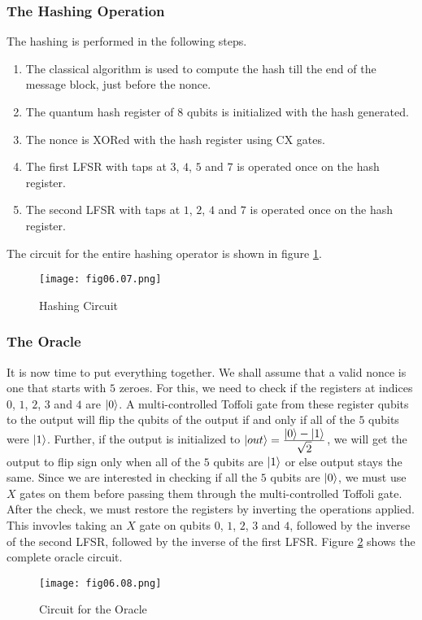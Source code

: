 \subsubsection*{The Hashing Operation}
\noindent The hashing is performed in the following steps.
\begin{enumerate}
\item The classical algorithm is used to compute the hash till the end of the message block, just before the nonce.
\item The quantum hash register of $8$ qubits is initialized with the hash generated.
\item The nonce is XORed with the hash register using CX gates.
\item The first LFSR with taps at $3$, $4$, $5$ and $7$ is operated once on the hash register.
\item The second LFSR with taps at $1$, $2$, $4$ and $7$ is operated once on the hash register.
\end{enumerate}
The circuit for the entire hashing operator is shown in figure \ref{Fig:6.7}.
\begin{figure}[!htb]
   \begin{minipage}{\textwidth}
     \centering
     \texttt{[image: fig06.07.png]}
     \caption{Hashing Circuit}
     \label{Fig:6.7}
   \end{minipage}
\end{figure}

\subsubsection*{The Oracle}
It is now time to put everything together. We shall assume that a valid nonce is one that starts with $5$ zeroes. For this, we need to check if the registers at indices $0$, $1$, $2$, $3$ and $4$ are $\left\vert 0\right\rangle$. A multi-controlled Toffoli gate from these register qubits to the output will flip the qubits of the output if and only if all of the $5$ qubits were $\left\vert 1\right\rangle$. Further, if the output is initialized to $\left\vert out\right\rangle=\frac{\displaystyle \left\vert 0\right\rangle-\left\vert 1\right\rangle}{\displaystyle \sqrt{2}}$, we will get the output to flip sign only when all of the $5$ qubits are $\left\vert 1\right\rangle$ or else output stays the same. Since we are interested in checking if all the $5$ qubits are $\left\vert 0\right\rangle$, we must use $X$ gates on them before passing them through the multi-controlled Toffoli gate. After the check, we must restore the registers by inverting the operations applied. This invovles taking an $X$ gate on qubits $0$, $1$, $2$, $3$ and $4$, followed by the inverse of the second LFSR, followed by the inverse of the first LFSR. Figure \ref{Fig:6.8} shows the complete oracle circuit.
\begin{figure}[!htb]
   \begin{minipage}{\textwidth}
     \centering
     \texttt{[image: fig06.08.png]}
     \caption{Circuit for the Oracle}
     \label{Fig:6.8}
   \end{minipage}
\end{figure}

